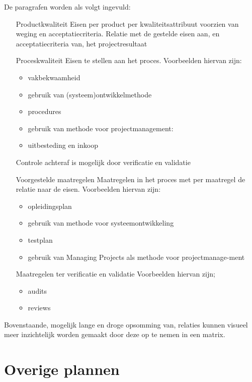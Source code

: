 \documentclass{article}
\begin{document}
De paragrafen worden als volgt ingevuld:

\begin{itemize}
  \item[Productkwaliteit] Eisen per product per kwaliteitsattribuut voorzien van weging en acceptatiecriteria.
  Relatie met de gestelde eisen aan, en acceptatiecriteria van, het projectresultaat
  \item[Proceskwaliteit] Eisen te stellen aan het proces. Voorbeelden hiervan zijn:
  \begin{itemize}
    \item vakbekwaamheid
    \item gebruik van (systeem)ontwikkelmethode
    \item procedures
    \item gebruik van methode voor projectmanagement:
    \item uitbesteding en inkoop
  \end{itemize}

  Controle achteraf is mogelijk door verificatie en validatie

  \item[Voorgestelde maatregelen] Maatregelen in het proces met per maatregel de relatie naar de eisen.
  Voorbeelden hiervan zijn:
  \begin{itemize}
    \item opleidingsplan
    \item gebruik van methode voor systeemontwikkeling
    \item testplan
    \item gebruik van Managing Projects als methode voor projectmanage-ment
  \end{itemize}

  Maatregelen ter verificatie en validatie
  Voorbeelden hiervan zijn;
  \begin{itemize}
    \item audits
    \item reviews
  \end{itemize}

\end{itemize}

Bovenstaande, mogelijk lange en droge opsomming van,
relaties kunnen visueel meer inzichtelijk worden gemaakt door deze op te nemen in een matrix.


\section{Overige plannen}
\end{document}
